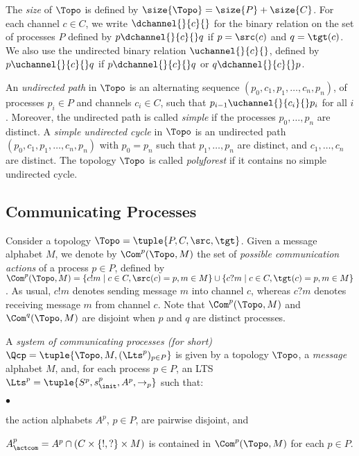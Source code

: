 \documentclass{LMCS}
\newenvironment{definition}{\begin{defi}}{\end{defi}}
\begin{document}
The \emph{size} of $\Topo$ is defined by $\size{\Topo} = \size{P}+\size{C}$.
For each channel $c \in C$, we write $\dchannel{}{c}{}$ for the binary
relation on the set of processes $P$ defined by $p\dchannel{}{c}{}q$
if $p=\src(c)$ and $q=\tgt(c)$. We also use the undirected
binary relation $\uchannel{}{c}{}$, defined by $p\uchannel{}{c}{}q$ if
$p\dchannel{}{c}{}q$ or $q\dchannel{}{c}{}p$.



An \emph{undirected path} in $\Topo$ is an alternating sequence
$(p_0,c_1,p_1,\ldots,c_n,p_n)$, of processes $p_i \in P$ and
channels $c_i \in C$,
such that $p_{i-1}\uchannel{}{c_i}{}p_i$ for all $i$.
Moreover, the undirected path is called \emph{simple} if the processes
$p_0, \ldots, p_n$ are distinct.
A \emph{simple undirected cycle} in $\Topo$ is an undirected path
$(p_0,c_1,p_1,\ldots,c_n,p_n)$ with $p_0 = p_n$
such that $p_1, \ldots, p_n$ are distinct, and
$c_1, \ldots, c_n$ are distinct. 
The topology $\Topo$ is called \emph{polyforest} if it contains no
simple undirected cycle.


\subsection{Communicating  Processes}

Consider a topology $\Topo = \tuple{P,C,\src,\tgt}$.
Given a message alphabet $M$, we denote by $\Com^p(\Topo,M)$ the set
of \emph{possible communication actions} of a process $p \in P$,
defined by $\Com^p(\Topo,M)=\{c!m \mid c\in C, \src(c)=p, m\in
M\}\cup\{c?m \mid c\in C, \tgt(c)=p, m\in M\}$.  As usual, $c!m$
denotes sending message $m$ into channel $c$, whereas $c?m$
denotes receiving message $m$ from channel $c$.
Note that $\Com^p(\Topo,M)$ and $\Com^q(\Topo,M)$ are disjoint when
$p$ and $q$ are distinct processes.



\begin{definition}
  A \emph{system of communicating processes (\qcp for short)}
  $\Qcp=\tuple{\Topo,M,(\Lts^p)_{p\in P}}$ is given by a topology
  $\Topo$, a \emph{message} alphabet $M$, and, for each process
  $p\in P$, an LTS $\Lts^p=\tuple{S^p,s_\init^p,A^p,\rightarrow_p}$
  such that:
  \begin{iteMize}{$\bullet$}
  \item the action alphabets $A^p$, $p \in P$, are pairwise disjoint, and
  \item $A^p_\actcom = A^p \cap (C\times\{!,?\}\times M)$ is contained in
    $\Com^p(\Topo,M)$ for each $p \in P$.
  \end{iteMize}
\end{definition}
\end{document}
